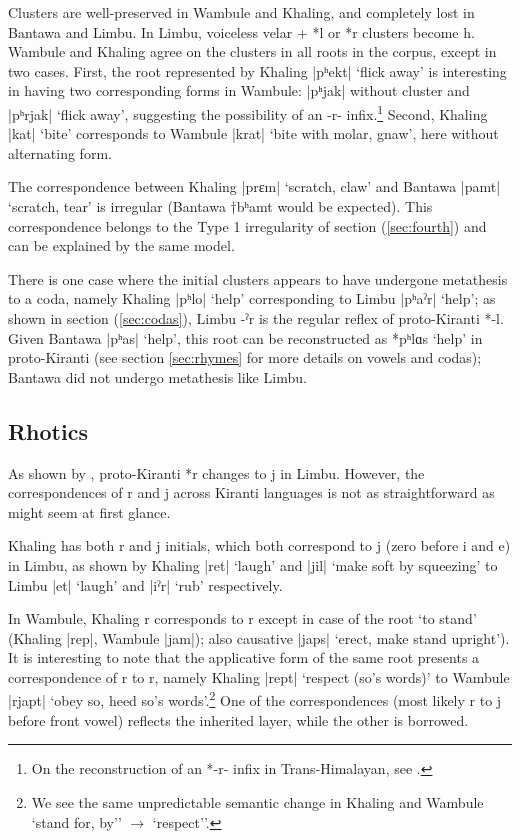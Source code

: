 \documentclass[oneside,a4paper,11pt]{article}
\newcommand{\ipa}[1]{{\phon\mbox{#1}}} %
\newcommand{\dhatu}[2]{|\ipa{#1}| `#2'}
\begin{document}
Clusters are well-preserved in Wambule and Khaling, and completely lost in Bantawa and Limbu. In Limbu, voiceless velar + *\ipa{l} or *\ipa{r} clusters become \ipa{h}. Wambule and Khaling  agree on the clusters in all roots in the corpus, except in two cases. First, the root represented by Khaling \dhatu{pʰekt}{flick away} is interesting in having two corresponding forms in Wambule: |\ipa{pʰjak}| without cluster and \dhatu{pʰrjak}{flick away}, suggesting the possibility of an \ipa{-r-} infix.\footnote{On the reconstruction of an *\ipa{-r-} infix in Trans-Himalayan, see \citet[111-120]{sagart99roc}.} Second, Khaling \dhatu{kat}{bite} corresponds to Wambule  \dhatu{krat}{bite with molar, gnaw}, here without alternating form.

The correspondence between Khaling \dhatu{prɛm}{scratch, claw} and Bantawa  \dhatu{pamt}{scratch, tear} is irregular (Bantawa $\dagger$\ipa{bʰamt} would be expected). This correspondence belongs to the Type 1 irregularity of section (\ref{sec:fourth}) and can be explained by the same model.

There is one case where the initial clusters appears to have undergone metathesis to a coda, namely Khaling \dhatu{pʰlo}{help} corresponding to Limbu \dhatu{pʰaˀr}{help}; as shown in section (\ref{sec:codas}), Limbu \ipa{-ˀr} is the regular reflex of proto-Kiranti *\ipa{-l}. Given Bantawa \dhatu{pʰas}{help}, this root can be reconstructed as *\ipa{pʰlɑs} `help' in proto-Kiranti (see section \ref{sec:rhymes} for more details on vowels and codas); Bantawa did not undergo metathesis like Limbu.
 
\subsection{Rhotics} 
As shown by  \citet{driem90r}, proto-Kiranti *\ipa{r} changes to \ipa{j} in Limbu. However, the correspondences of \ipa{r} and \ipa{j} across Kiranti languages is not as straightforward as might seem at first glance.

Khaling has both \ipa{r} and \ipa{j} initials, which both correspond to \ipa{j} (zero before \ipa{i} and \ipa{e}) in Limbu, as shown by Khaling \dhatu{ret}{laugh} and  \dhatu{jil}{make soft by squeezing} to Limbu \dhatu{et}{laugh} and \dhatu{iˀr}{rub} respectively.

In Wambule, Khaling \ipa{r} corresponds to \ipa{r} except in case of the root `to stand' (Khaling |\ipa{rep}|, Wambule  |\ipa{jam}|); also causative \dhatu{japs}{erect, make stand upright}). It is interesting to note that the applicative form of the same root presents a correspondence of \ipa{r} to \ipa{r}, namely Khaling \dhatu{rept}{respect (so's words)} to Wambule \dhatu{rjapt}{obey so, heed so's words}.\footnote{We see the same unpredictable semantic change in Khaling and Wambule `stand for, by'' $\rightarrow$ `respect''.} One of the correspondences (most likely \ipa{r} to \ipa{j} before front vowel) reflects the inherited layer, while the other is borrowed.  
\end{document}

